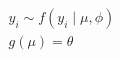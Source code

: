 \documentclass[border=3bp]{standalone}
\begin{document}
$
\begin{gathered}
y_i \sim f(y_i \mid \mu, \phi) \\[8pt]
g(\mu) = \theta
\end{gathered}
$
\end{document}
